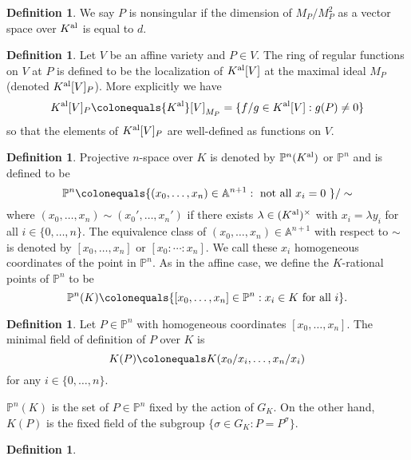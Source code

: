 \documentclass{dcthesis}
\newcommand{\PP}{\mathbb P}
\renewcommand{\AA}{\mathbb A}
\newcommand{\defi}[1]{\textsf{#1}}
\newcommand{\Kal}{{{K}^{\textup{al}}}}
\theoremstyle{definition}
\newtheorem{definition}[prop]{Definition}
\theoremstyle{remark}
\numberwithin{equation}{section}
\numberwithin{figure}{section}
\begin{document}
{{\begin{definition}
      We say $P$ is \defi{nonsingular}
      if the dimension of $M_P/M_P^2$ as
      a vector space over $\Kal$
      is equal to $d$.
    \end{definition}
    \begin{definition}
      \label{def:localringatP}
      Let $V$ be an affine variety
      and $P\in V$.
      The \defi{ring of regular functions on $V$ at $P$}
      is defined to be the localization
      of $\Kal[V]$ at the maximal ideal $M_P$
      (denoted $\Kal[V]_P$).
      More explicitly we have
      \[
        \Kal[V]_P
        \colonequals
        \Kal[V]_{M_P}
        =
        \{f/g\in\Kal[V]:g(P)\neq 0\}
      \]
      so that
      the elements of
      $\Kal[V]_P$
      are well-defined
      as functions on $V$.
    \end{definition}
    \begin{definition}
      \label{def:projectivespace}
      \defi{Projective $n$-space}
      over $K$ is denoted by $\PP^n(\Kal)$
      or $\PP^n$
      and is defined to be
      \[
        \PP^n\colonequals
        \{(x_0,\dots,x_{n})\in\AA^{n+1}:\text{ not all $x_i=0$ }\}/\sim
      \]
      where
      $(x_0,\dots,x_n)\sim(x_0',\dots,x_n')$
      if there exists $\lambda\in(\Kal)^\times$ with
      $x_i=\lambda y_i$ for all $i\in \{0,\dots,n\}$.
      The equivalence class of $(x_0,\dots,x_n)\in\AA^{n+1}$
      with respect to $\sim$ is denoted by
      $[x_0,\dots,x_n]$ or $[x_0:\cdots:x_n]$.
      We call these $x_i$
      \defi{homogeneous coordinates}
      of the point in $\PP^n$.
      As in the affine case,
      we define the
      \defi{$K$-rational points} of $\PP^n$
      to be
      \[
        \PP^n(K)\colonequals
        \{[x_0,\dots,x_n]\in\PP^n:x_i\in K \text{ for all } i\}.
      \]
    \end{definition}
    \begin{definition}
      \label{def:minimalfieldofdefinitionPPn}
      Let $P\in\PP^n$ with homogeneous coordinates
      $[x_0,\dots,x_n]$.
      The \defi{minimal field of definition of $P$ over $K$}
      is
      \[
        K(P)\colonequals
        K(x_0/x_i,\dots,x_n/x_i)
      \]
      for any $i\in \{0,\dots,n\}$.
    \end{definition}
    $\PP^n(K)$ is the set of $P\in\PP^n$
    fixed by the action of $G_K$.
    On the other hand,
    $K(P)$ is the fixed field of the
    subgroup
    $\{\sigma\in G_K: P = P^\sigma\}$.
    \begin{definition}
      \label{def:homogeneousideal}

\end{definition}}}
\end{document}
